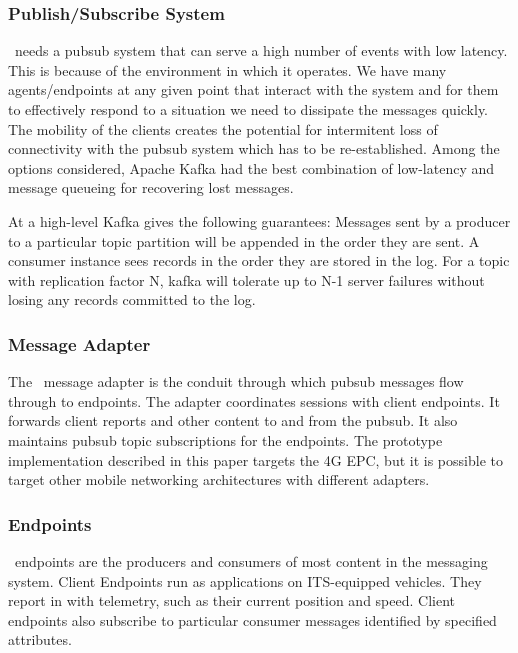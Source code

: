 \subsubsection{Publish/Subscribe System}

\name~needs a pubsub system that can serve a high number of events
with low latency. This is because of the environment in which it
operates.  We have many agents/endpoints at any given point that
interact with the system and for them to effectively respond to a
situation we need to dissipate the messages quickly. The mobility of
the clients creates the potential for intermitent loss of connectivity
with the pubsub system which has to be re-established. Among the options
considered, Apache Kafka had the best combination of low-latency and
message queueing for recovering lost messages.

At a high-level Kafka gives the following guarantees: Messages sent by a 
producer to a particular topic partition will be appended in the order they are
sent. A consumer instance sees records in the order they are stored in the log. 
For a topic with replication factor N, kafka will tolerate up to N-1 server 
failures without losing any records committed to the log.

\subsubsection{Message Adapter}

The \name~message adapter is the conduit through which pubsub
messages flow through to endpoints. The adapter coordinates sessions
with client endpoints. It forwards client reports and other content to
and from the pubsub. It also maintains pubsub topic subscriptions for
the endpoints. The prototype implementation described in this
paper targets the 4G EPC, but it is possible to target other mobile
networking architectures with different adapters.

\subsubsection{Endpoints}

\name~endpoints are the producers and consumers of most content in
the messaging system. Client Endpoints run as applications on
ITS-equipped vehicles.  They report in with telemetry, such as their
current position and speed.  Client endpoints also subscribe to
particular consumer messages identified by specified attributes.

